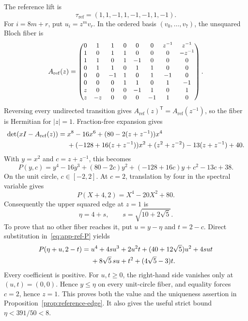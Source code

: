 The reference lift is
\[
 \tau_{\mathrm{ref}}=(1,1,-1,1,-1,-1,1,-1).
\]
For \(i=8m+r\), put \(u_i=z^m v_r\).  In the ordered basis
\((v_0,\ldots,v_7)\), the unsquared Bloch fiber is
\[
\small
A_{\mathrm{ref}}(z)=
\begin{pmatrix}
0&1&1&0&0&0&z^{-1}&z^{-1}\\
1&0&1&1&0&0&0&-z^{-1}\\
1&1&0&1&-1&0&0&0\\
0&1&1&0&1&1&0&0\\
0&0&-1&1&0&1&-1&0\\
0&0&0&1&1&0&1&-1\\
z&0&0&0&-1&1&0&1\\
z&-z&0&0&0&-1&1&0
\end{pmatrix}.
\normalsize
\]
Reversing every undirected transition gives
\(A_{\mathrm{ref}}(z)^{\mathsf T}=A_{\mathrm{ref}}(z^{-1})\), so the
fiber is Hermitian for \(|z|=1\).  Fraction-free expansion gives
\begin{align}
\det(xI-A_{\mathrm{ref}}(z))={}&x^8-16x^6
 +(80-2(z+z^{-1}))x^4 \notag\\
&+(-128+16(z+z^{-1}))x^2
 +(z^2+z^{-2})-13(z+z^{-1})+40.       \label{eq:app-ref-det}
\end{align}
With \(y=x^2\) and \(c=z+z^{-1}\), this becomes
\begin{equation}
 P(y,c)=y^4-16y^3+(80-2c)y^2+(-128+16c)y
        +c^2-13c+38.                 \label{eq:app-ref-P}
\end{equation}
On the unit circle, \(c\in[-2,2]\).  At \(c=2\), translation by four in
the spectral variable gives
\[
 P(X+4,2)=X^4-20X^2+80.
\]
Consequently the upper squared edge at \(z=1\) is
\[
 \eta=4+s,
 \qquad s=\sqrt{10+2\sqrt5}.
\]
To prove that no other fiber reaches it, put \(u=y-\eta\) and \(t=2-c\).
Direct substitution in~\eqref{eq:app-ref-P} yields
\begin{align}
P(\eta+u,2-t)={}&u^4+4su^3+2u^2t
 +(40+12\sqrt5)u^2+4sut \notag\\
&+8\sqrt5\,su+t^2+(4\sqrt5-3)t.      \label{eq:app-edge-positive}
\end{align}
Every coefficient is positive.  For \(u,t\geq0\), the right-hand side
vanishes only at \((u,t)=(0,0)\).  Hence \(y\leq\eta\) on every unit-circle
fiber, and equality forces \(c=2\), hence \(z=1\).  This proves both the
value and the uniqueness assertion in
Proposition~\ref{prop:reference-edge}.  It also gives the useful strict
bound \(\eta<391/50<8\).


